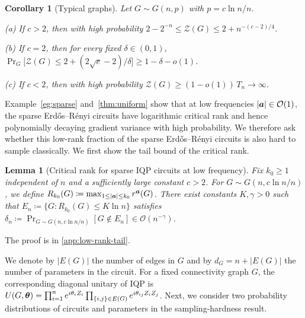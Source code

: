\documentclass{article}
\theoremstyle{plain}
\newtheorem{lemma}[theorem]{Lemma}
\newtheorem{corollary}[theorem]{Corollary}
\theoremstyle{definition}
\theoremstyle{remark}
\begin{document}
\begin{corollary}[Typical graphs]\label{cor:erm-typical}
Let $G\sim G(n,p)$ with $p=c\ln n/n$.

\noindent\textup{(a)} If $c>2$, then with high probability $2-2^{-n}\le\mathcal Z(G)\le2+n^{-(c-2)/4}$.

\noindent\textup{(b)} If $c=2$, then for every fixed $\delta\in(0,1)$, $\Pr_G\big[\mathcal Z(G)\le2+(2\sqrt e-2)/\delta\big]\ge1-\delta-o(1)$.

\noindent\textup{(c)} If $c<2$, then with high probability $\mathcal Z(G)\ge(1-o(1))\,T_n\to\infty$.
\end{corollary}

Example~\ref{eg:sparse} and~\cref{thm:uniform} show that at low frequencies $\abs{{\bm{a}}}\in\mathcal{O}(1)$, the sparse Erd\H{o}s--R\'enyi circuits have logarithmic critical rank and hence polynomially decaying gradient variance with high probability. We therefore ask whether this low-rank fraction of the sparse Erd\H{o}s--R\'enyi circuits is also hard to sample classically. We first show the tail bound of the critical rank.

\begin{lemma}[Critical rank for sparse IQP circuits at low frequency] \label{lemma:low-rank-tail}
Fix $k_0 \geq 1$ independent of $n$ and a sufficiently large constant
$c>2$. For $G\sim G(n,c\ln n/n)$, we define $R_{k_0}(G) \coloneqq \max_{1\leq\abs{{\bm{a}}}\leq k_0}r^{{\bm{a}}}(G)$.
There exist constants $K,\gamma>0$ such that $E_n \coloneqq \{G \colon R_{k_0}(G)\leq K\ln n\}$ satisfies $\delta_n \coloneqq\Pr_{G\sim G(n,c\ln n/n)}[G\notin E_n] \in \mathcal{O}(n^{-\gamma})$.
\end{lemma}
The proof is in \cref{app:low-rank-tail}.

We denote by $|E(G)|$ the number of edges in $G$ and by $d_G = n + |E(G)|$ the number of parameters in the circuit. For a fixed connectivity graph $G$, the corresponding diagonal unitary of IQP is $U(G,{\bm{\theta}})=\prod_{i=1}^n e^{i\theta_i Z_i}\prod_{\{i,j\}\in E(G)}e^{i\theta_{ij}Z_iZ_j}$. Next, we consider two probability distributions of circuits and parameters in the sampling-hardness result. 
\end{document}
